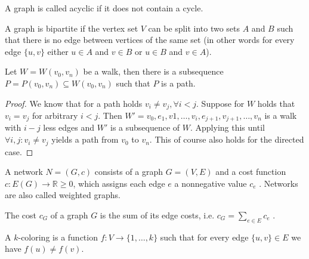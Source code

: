 \begin{definition}
A graph is called acyclic if it does not contain a cycle.
\end{definition}

\begin{definition}
A graph is bipartite if the vertex set $V$ can be split into two sets $A$ and $B$ such that there is no edge between vertices of the same set (in other words for every edge $\{u, v\}$ either $u \in A$ and $v \in B$ or $u \in B$ and $v \in A$).
\end{definition}

\begin{theorem}
Let $W = W(v_0,v_n)$ be a walk, then there is a subsequence $P = P(v_0,v_n) \subseteq W(v_0,v_n)$ such that $P$ is a path.
\label{theo:pathinwalk}
\end{theorem}

\begin{proof}
We know that for a path holds $v_i \neq v_j, \forall i < j$. Suppose for $W$ holds that $v_i = v_j$ for arbitrary $i < j$. Then $W' = v_0,e_1,v1,\ldots,v_i,e_{j+1},v_{j+1},\ldots,v_n$ is a walk with $i-j$ less edges and $W'$ is a subsequence of $W$. Applying this until $\forall i, j : v_i \neq v_j$ yields a path from $v_0$ to $v_n$. This of course also holds for the directed case.
\end{proof}

\begin{definition}[Network]
A network $N = (G, c)$ consists of a graph $G = (V, E)$ and a cost function $c : E(G) \longrightarrow \mathbb{R} \geq 0$, which assigns each edge $e$ a nonnegative value $c_e$ . Networks are also called weighted graphs.
\end{definition}

\begin{definition}
The cost $c_G$ of a graph $G$ is the sum of its edge costs, i.e. $c_G = \sum_{e\in E}c_e$ .
\end{definition}


\begin{definition}[$k$-coloring]
A $k$-coloring is a function $f : V \rightarrow \{1,\ldots , k\}$ such that
for every edge $\{u, v\}\in E$ we have $f(u) \neq f(v)$.
\end{definition}

